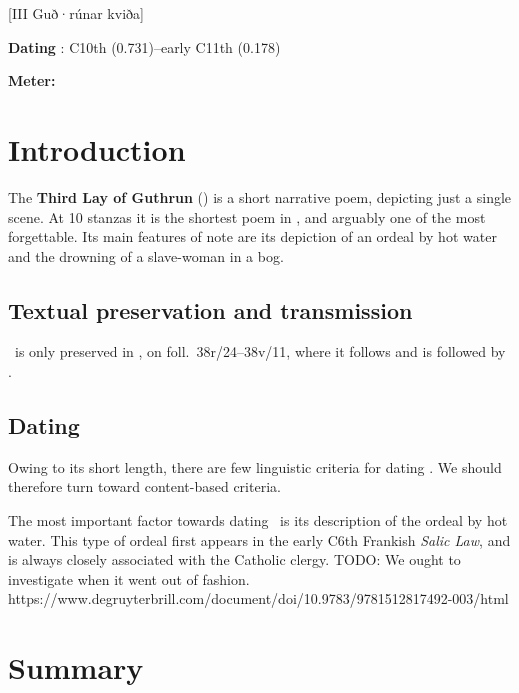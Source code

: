 [III Guð·rúnar kviða]

\begin{flushright}%
\textbf{Dating} \parencite{Sapp2022}: C10th (0.731)--early C11th (0.178)

\textbf{Meter:} \Fornyrdislag%
\end{flushright}

\section{Introduction}

The \textbf{Third Lay of Guthrun} (\GudrunThree) is a short narrative poem, depicting just a single scene.  At 10 stanzas it is the shortest poem in \Regius, and arguably one of the most forgettable.  Its main features of note are its depiction of an ordeal by hot water and the drowning of a slave-woman in a bog.

\subsection{Textual preservation and transmission}

\GudrunThree\ is only preserved in \Regius, on foll.~38r/24--38v/11, where it follows  and is followed by .

\subsection{Dating}

Owing to its short length, there are few linguistic criteria for dating \GudrunThree.  We should therefore turn toward content-based criteria.

The most important factor towards dating \GudrunThree\ is its description of the ordeal by hot water.  This type of ordeal first appears in the early C6th Frankish \emph{Salic Law}, and is always closely associated with the Catholic clergy.  TODO: We ought to investigate when it went out of fashion.  https://www.degruyterbrill.com/document/doi/10.9783/9781512817492-003/html

\section{Summary}


